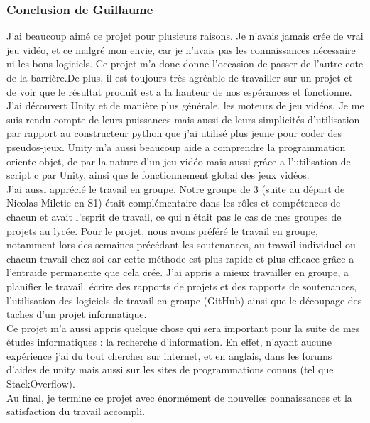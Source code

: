 \documentclass[12pt, titlepage]{article}
\begin{document}
\begin{spacing}{1.5}
\subsubsection{Conclusion de Guillaume}

J'ai beaucoup aimé ce projet pour plusieurs raisons. Je n'avais jamais crée de vrai jeu vidéo, et ce malgré mon  envie, car je n'avais pas les connaissances nécessaire ni les bons logiciels. Ce projet m'a donc donne l'occasion de passer de l'autre cote de la barrière.De plus, il est toujours très agréable de travailler sur un projet et de voir que le résultat produit est a la hauteur de nos espérances et fonctionne.\\


J'ai découvert Unity et de manière plus générale, les moteurs de jeu vidéos. Je me suis rendu compte de leurs puissances mais aussi de leurs simplicités d'utilisation par rapport au constructeur python que j'ai utilisé plus jeune pour coder des pseudos-jeux. Unity m'a aussi beaucoup aide a comprendre la programmation oriente objet, de par la nature d'un jeu vidéo mais aussi grâce a l'utilisation de script c par Unity, ainsi que le fonctionnement global des jeux vidéos.\\

J'ai aussi apprécié le travail en groupe. Notre groupe de 3 (suite au départ de Nicolas Miletic en S1) était complémentaire dans les rôles et compétences de chacun et avait l'esprit de travail, ce qui n'était pas le cas de mes groupes de projets au lycée. Pour le projet, nous avons préféré le travail en groupe, notamment lors des semaines précédant les soutenances, au travail individuel ou chacun travail chez soi car cette méthode est plus rapide et plus efficace grâce a l'entraide permanente que cela crée. J'ai appris a mieux travailler en groupe, a planifier le travail, écrire des rapports de projets et des rapports de soutenances, l'utilisation des logiciels de travail en groupe (GitHub) ainsi que le découpage des taches d'un projet informatique. \\

Ce projet m'a aussi appris quelque chose qui sera important pour la suite de mes études informatiques : la recherche d'information. En effet, n'ayant aucune expérience j'ai du tout chercher sur internet, et en anglais, dans les forums d'aides de unity mais aussi sur les sites de programmations connus (tel que StackOverflow). \\

Au final, je termine ce projet avec énormément de nouvelles connaissances et la satisfaction du travail accompli.\\


\end{spacing}
\end{document}

